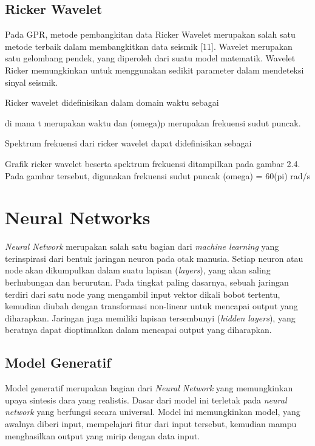 \subsection{Ricker Wavelet}
\label{subsec:rickerWavelet}

Pada GPR, metode pembangkitan data Ricker Wavelet merupakan salah satu metode terbaik dalam membangkitkan data seismik [11]. 
Wavelet merupakan satu gelombang pendek, yang diperoleh dari suatu model matematik. 
Wavelet Ricker memungkinkan untuk menggunakan sedikit parameter dalam mendeteksi sinyal seismik.

Ricker wavelet didefinisikan dalam domain waktu sebagai

di mana t merupakan waktu dan (omega)p merupakan frekuensi sudut puncak.

Spektrum frekuensi dari ricker wavelet dapat didefinisikan sebagai

Grafik ricker wavelet beserta spektrum frekuensi ditampilkan pada gambar 2.4. 
Pada gambar tersebut, digunakan frekuensi sudut puncak (omega) = 60(pi) rad/s

\section{Neural Networks}
\label{sec:neuralNetworks}

\emph{Neural Network} merupakan salah satu bagian dari \emph{machine learning} yang terinspirasi dari bentuk jaringan neuron pada otak manusia. 
Setiap neuron atau node akan dikumpulkan dalam suatu lapisan (\emph{layers}), yang akan saling berhubungan dan berurutan. 
Pada tingkat paling dasarnya, sebuah jaringan terdiri dari satu node yang mengambil input vektor dikali bobot tertentu, kemudian diubah dengan transformasi non-linear untuk mencapai output yang diharapkan. 
Jaringan juga memiliki lapisan tersembunyi (\emph{hidden layers}), yang beratnya dapat dioptimalkan dalam mencapai output yang diharapkan.

\subsection{Model Generatif}
\label{subsec:modelGeneratif}

Model generatif merupakan bagian dari \emph{Neural Network} yang memungkinkan upaya sintesis dara yang realistis. 
Dasar dari model ini terletak pada \emph{neural network} yang berfungsi secara universal. 
Model ini memungkinkan model, yang awalnya diberi input, mempelajari fitur dari input tersebut, kemudian mampu menghasilkan output yang mirip dengan data input.

